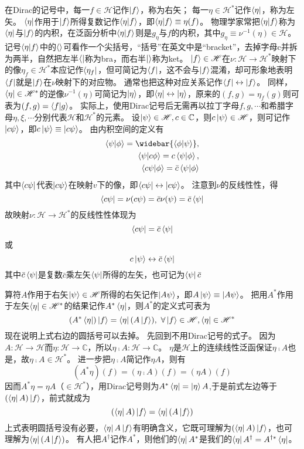 在Dirac的记号中，每一$f \in \mathscr{H}$记作$\ket{f}$，称为右矢；
每一$\eta \in \mathscr{H}^*$记作$\bra{\eta}$，称为左矢。
$\bra{\eta}$作用于$\ket{f}$所得复数记作$\braket{\eta | f}$，即$\braket{\eta | f} \equiv \eta(f)$。
物理学家常把$\braket{\eta | f}$称为$\bra{\eta}$与$\ket{f}$的内积，在泛函分析中$\braket{\eta | f}$则是$g_\eta$与$f$的内积，其中$g_\eta \equiv \nu^{-1}(\eta) \in \mathscr{H}$。
记号$\braket{\eta | f}$中的$\braket{}$可看作一个尖括号，``括号''在英文中是``bracket''，去掉字母c并拆为两半，自然把左半$\bra{}$称为bra，而右半$\ket{}$称为ket。
$\ket{f} \in \mathscr{H}$在$\nu \colon \mathscr{H} \to \mathscr{H}^*$映射下的像$\eta_f \in \mathscr{H}^*$本应记作$\bra{\eta_f}$，但可简记为$\bra{f}$，这不会与$\ket{f}$混淆，却可形象地表明$\bra{f}$就是$\ket{f}$在$\nu$映射下的对应物。
通常也把这种对应关系记作$\bra{f} \leftrightarrow \ket{f}$。
同样，$\bra{\eta} \in \mathscr{H}^*$的逆像$\nu^{-1}(\eta)$可简记为$\ket{\eta}$，即$\bra{\eta} \leftrightarrow \ket{\eta}$，原来的$(f, g) = \eta_f(g)$则可表为$(f, g) = \braket{f | g}$。
实际上，使用Dirac记号后无需再以拉丁字母$f, g, \cdots$和希腊字母$\eta, \xi, \cdots$分别代表$\mathscr{H}$和$\mathscr{H}^*$的元素。
设$\ket{\psi} \in \mathscr{H}, c \in \mathbb{C}$，则$c\ket{\psi} \in \mathscr{H}$，则可记作$\ket{c\psi}$，即$c\ket{\psi} \equiv \ket{c\psi}$。
由内积空间的定义有
\[\begin{split}
    \braket{\psi | \phi} = \widebar{\braket{\phi | \psi}}, \\
    \braket{\psi | c\phi} = c\braket{\psi | \phi}, \\
    \braket{c\psi | \phi} = \bar{c}\braket{\psi | \phi}
\end{split}\]
其中$\bra{c\psi}$代表$\ket{c\psi}$在映射$v$下的像，即$\bra{c\psi} \leftrightarrow \ket{c\psi}$。
注意到$\nu$的反线性性，得
$$\bra{c\psi} = \nu(c\psi) = \bar{c}\nu(\psi) = \bar{c}\bra{\psi}$$
故映射$\nu \colon \mathscr{H} \to \mathscr{H}^*$的反线性性体现为
$$\bra{c\psi} = \bar{c}\bra{\psi}$$
或
$$c\ket{\psi} \leftrightarrow \bar{c}\bra{\psi}$$
其中$\bar{c}\bra{\psi}$是复数$\bar{c}$乘左矢$\bra{\psi}$所得的左矢，也可记为$\bra{\psi}\bar{c}$

算符$A$作用于右矢$\ket{\psi} \in \mathscr{H}$所得的右矢记作$\ket{A\psi}$，即$A\ket{\psi} \equiv \ket{A\psi}$。
把用$A^*$作用于左矢$\bra{\eta} \in \mathscr{H}^*$的结果记作$A^*\bra{\eta}$，则$A^*$的定义式可表为
$$(A^*\bra{\eta})\ket{f} = \bra{\eta}(A\ket{f}), ~ \forall \ket{f} \in \mathscr{H}, \bra{\eta} \in \mathscr{H}^*$$
现在说明上式右边的圆括号可以去掉。
先回到不用Dirac记号的式子。
因为$A \colon \mathscr{H} \to \mathscr{H}$而$\eta \colon \mathscr{H} \to \mathbb{C}$，所以$\eta \comp A \colon \mathscr{H} \to \mathbb{C}$。
$\eta$是$\mathscr{H}$上的连续线性泛函保证$\eta \comp A$也是，故$\eta \comp A \in \mathscr{H}^*$。
进一步把$\eta \comp A$简记作$\eta A$，则有
$$(A^*\eta)(f) = (\eta \comp A)(f) = (\eta A)(f)$$
因而$A^*\eta = \eta A$（$\in \mathscr{H}^*$），用Dirac记号则为$A^*\bra{\eta} = \ket{\eta}A$,于是前式左边等于$(\bra{\eta}A)\ket{f}$，前式就成为
$$(\bra{\eta}A)\ket{f} = \bra{\eta}(A\ket{f})$$
上式表明圆括号没有必要，$\bra{\eta}A\ket{f}$有明确含义，它既可理解为$(\bra{\eta}A)\ket{f}$，也可理解为$\bra{\eta}(A\ket{f})$。
有人把$A^\dagger$记作$A^*$，则他们的$\bra{\eta}A^*$是我们的$\bra{\eta}A^\dagger = A^{\dagger*}\bra{\eta}$。

